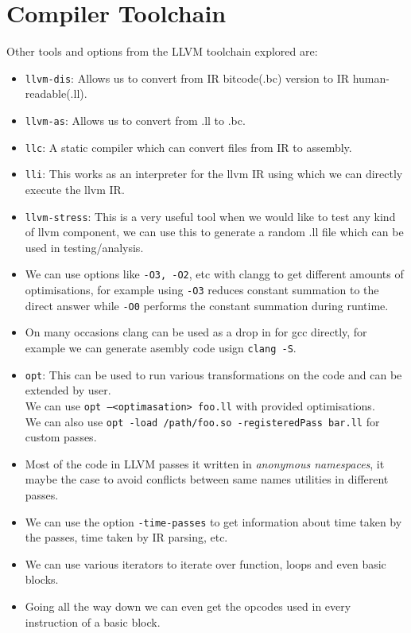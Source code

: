 \documentclass[12pt]{article}
\newcommand{\code}{\texttt}
\begin{document}
\section{Compiler Toolchain}
Other tools and options from the LLVM toolchain explored are:
\begin{itemize}
\item \code{llvm-dis}: Allows us to convert from IR bitcode(.bc) version to IR human-readable(.ll).
\item \code{llvm-as}: Allows us to convert from .ll to .bc.
\item \code{llc}: A static compiler which can convert files from IR to assembly.
\item \code{lli}: This works as an interpreter for the llvm IR using which we can directly execute the llvm IR.
\item \code{llvm-stress}: This is a very useful tool when we would like to test any kind of llvm component, we can use this to generate a random .ll file which can be used in testing/analysis.
\item We can use options like \code{-O3, -O2}, etc with clangg to get different amounts of optimisations, for example using \code{-O3} reduces constant summation to the direct answer while \code{-O0} performs the constant summation during runtime.
\item On many occasions clang can be used as a drop in for gcc directly, for example we can generate asembly code usign \code{clang -S}.
\item \code{opt}: This can be used to run various transformations on the code and can be extended by user.\\
We can use \code{opt --<optimasation> foo.ll} with provided optimisations.\\
We can also use \code{opt -load /path/foo.so -registeredPass bar.ll} for custom passes.
\item Most of the code in LLVM passes it written in \textit{anonymous namespaces}, it maybe the case to avoid conflicts between same names utilities in different passes.
\item We can use the option \code{-time-passes} to get information about time taken by the passes, time taken by IR parsing, etc.
\item We can use various iterators to iterate over function, loops and even basic blocks.
\item Going all the way down we can even get the opcodes used in every instruction of a basic block.
\end{itemize}
\newpage
\end{document}
